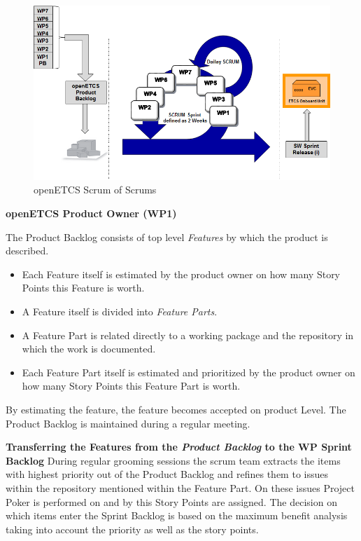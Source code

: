 \newpage
\begin{figure}[h]
	\centering
	\includegraphics[width=0.95\linewidth]{images/openETCS_WPs_in_SCRUMsprint}
	\caption{openETCS Scrum of Scrums}
	\label{fig:openETCSWPinSprint}
\end{figure}
	





\textbf{openETCS Product Owner (WP1)}

The Product Backlog consists of top level \textit{Features} by which the product is described.
\begin{itemize}
\item  Each Feature itself is estimated by the product owner on how many Story Points this Feature is worth.
\item  A Feature itself is divided into \textit{Feature Parts}.
\item  A Feature Part is related directly to a working package and the repository in which the work is documented.
\item  Each Feature Part itself is estimated and prioritized by the product owner on how many Story Points this Feature Part is worth.
\end{itemize}


By estimating the feature, the feature becomes accepted on product Level.
The Product Backlog is maintained during a regular meeting.

\textbf{Transferring the Features from the \textit{Product Backlog} to the WP Sprint Backlog}
During regular grooming sessions the scrum team extracts the items with highest priority out of the Product Backlog and refines them to issues within the repository mentioned within the Feature Part.
On these issues Project Poker is performed on and by this Story Points are assigned. The decision on which items enter the Sprint Backlog is based on the maximum benefit analysis taking into account the priority as well as the story points.

